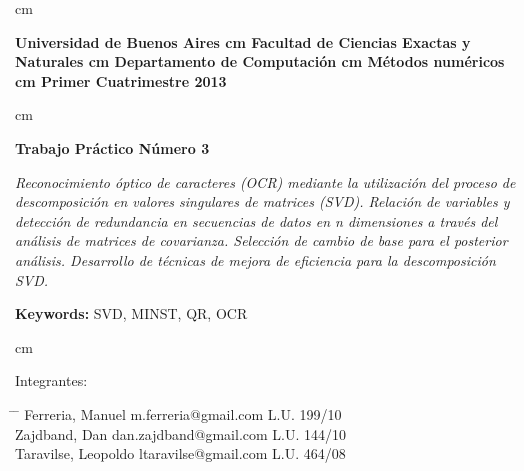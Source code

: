  cm
\begin{flushright}
\huge\bf Universidad de Buenos Aires
 cm
\Large\bf Facultad de Ciencias Exactas y Naturales
 cm
\Large\bf Departamento de Computaci\'on
 cm
\Large\bf  M\'etodos num\'ericos
 cm
\Large\bf Primer Cuatrimestre 2013
\end{flushright}

 cm
\begin{center}
\LARGE\bf Trabajo Pr\'actico N\'umero 3

\vskip 1.0cm
\normalsize \emph{
Reconocimiento \'optico de caracteres (OCR) mediante la utilizaci\'on del proceso de descomposici\'on en valores singulares de matrices (SVD). Relaci\'on de variables y detecci\'on de redundancia en secuencias de datos en n dimensiones a trav\'es del an\'alisis de matrices de covarianza. Selecci\'on de cambio de base para el posterior an\'alisis. Desarrollo de t\'ecnicas de mejora de eficiencia para la descomposici\'on SVD.
}

\vskip 1.0cm
\large {\bf Keywords:} SVD, MINST, QR, OCR

\end{center}



 cm
\begin{flushleft}
\large Integrantes:
\begin{tabbing}
\hspace{5cm} \= \hspace{5.5cm} \= \hspace{3cm} \kill
Ferreria, Manuel \> m.ferreria@gmail.com \> L.U. 199/10  \\
Zajdband, Dan \> dan.zajdband@gmail.com \> L.U. 144/10 \\
Taravilse, Leopoldo \> ltaravilse@gmail.com \> L.U. 464/08\\
\end{tabbing}
\end{flushleft}
